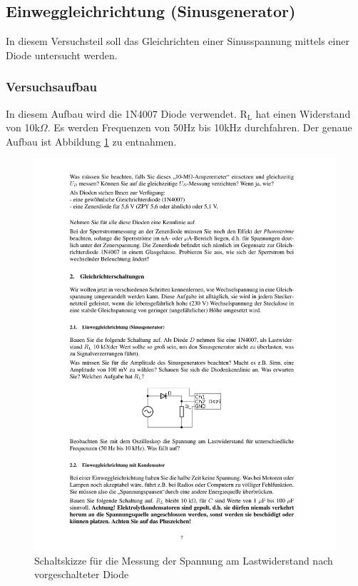 \documentclass[12pt,a4paper]{article}
\begin{document}
\subsection{Einweggleichrichtung (Sinusgenerator)}
In diesem Versuchsteil soll das Gleichrichten einer Sinusspannung mittels einer Diode untersucht werden.
\subsubsection{Versuchsaufbau}
In diesem Aufbau wird die 1N4007 Diode verwendet. R$_\text{L}$ hat einen Widerstand von 10k$\Omega$. Es werden Frequenzen von 50Hz bis 10kHz durchfahren. Der genaue Aufbau ist Abbildung \ref{fig:2_1} zu entnahmen.

\begin{figure}[H] 
  \centering
    \includegraphics[trim = 10mm 80mm 10mm 160mm, clip, scale = 1]{ep2_14[Page7].pdf}
  	\caption[Schaltskizze für die Messung der Spannung am Lastwiderstand nach vorgeschalteter Diode]{Schaltskizze für die Messung der Spannung am Lastwiderstand nach vorgeschalteter Diode\footnotemark}
  \label{fig:2_1}
\end{figure}
\end{document}
